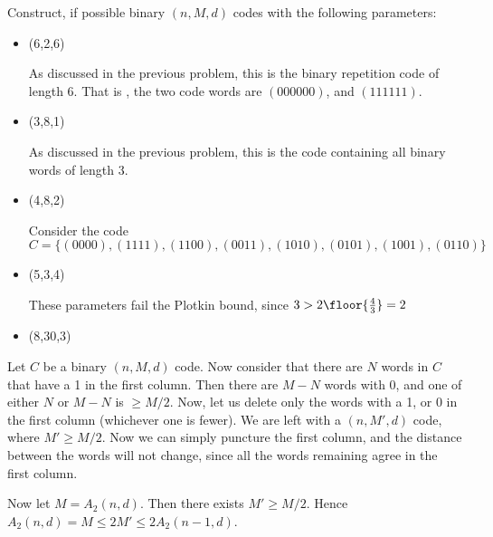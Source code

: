 \documentclass{homework}
\begin{document}
\begin{problem}
  Construct, if possible binary $(n,M,d)$ codes with the following parameters:

  \begin{itemize}
    \item (6,2,6)

      As discussed in the previous problem, this is the binary repetition code
      of length 6. That is , the two code words are $(000000)$, and $(111111)$.
    \item (3,8,1)

      As discussed in the previous problem, this is the code containing all
      binary words of length 3.
    \item (4,8,2)

      Consider the code $C =
      \{(0000),(1111),(1100),(0011),(1010),(0101),(1001),(0110)\}$

    \item (5,3,4)

      These parameters fail the Plotkin bound, since $3 > 2\floor{\frac{4}{3}} =
      2$
    \item (8,30,3)

  \end{itemize}
\end{problem}

\begin{problem}
  Let $C$ be a binary $(n,M,d)$ code. Now consider that there are $N$
  words in $C$ that have a 1 in the first column. Then there are $M-N$ words
  with 0, and one of either $N$ or $M-N$ is $\ge M/2$. Now, let us delete only
  the words with a 1, or 0 in the first column (whichever one is fewer). We are
  left with a $(n,M',d)$ code, where $M' \ge M/2$. Now we can simply puncture
  the first column, and the distance between the words will not change, since
  all the words remaining agree in the first column.

  Now let $M = A_2(n,d)$. Then there exists  $M' \ge M/2$. Hence  $A_2(n,d) = M
  \le 2M' \le 2A_2(n-1,d)$.

\end{problem}
\end{document}
